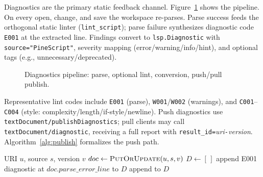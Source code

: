 \documentclass[11pt,a4paper]{article}
\begin{document}
Diagnostics are the primary static feedback channel. Figure~\ref{fig:diagnostics}
shows the pipeline. On every open, change, and save the workspace re-parses. Parse
success feeds the orthogonal static linter (\texttt{lint\_script}); parse failure
synthesizes diagnostic code \texttt{E001} at the extracted line. Findings convert to
\texttt{lsp.Diagnostic} with \texttt{source="PineScript"}, severity mapping
(error/warning/info/hint), and optional tags (e.g., unnecessary/deprecated).

\begin{figure}[t]
\centering
{}
\caption{Diagnostics pipeline: parse, optional lint, conversion, push/pull publish.}
\label{fig:diagnostics}
\end{figure}

Representative lint codes include \texttt{E001} (parse), \texttt{W001}/\texttt{W002}
(warnings), and \texttt{C001}--\texttt{C004} (style: complexity/length/if-style/newline).
Push diagnostics use \texttt{textDocument/publishDiagnostics}; pull clients may call
\texttt{textDocument/diagnostic}, receiving a full report with
\texttt{result\_id=}\textit{uri}\texttt{-}\textit{version}. Algorithm~\ref{alg:publish} formalizes
the push path.

\begin{algorithm}[t]
\caption{PublishDiagnostics on document mutation}
\label{alg:publish}
\begin{algorithmic}[1]
\Require URI \(u\), source \(s\), version \(v\)
\State \(doc \gets \textsc{PutOrUpdate}(u, s, v)\)
\State {}
\State \(D \gets [\,]\)
  \State append E001 diagnostic at \(doc.\mathit{parse\_error\_line}\) to \(D\)
\EndIf
{}
  \State append  to \(D\)
\EndFor
\State {}
\end{algorithmic}
\end{algorithm}
\end{document}
